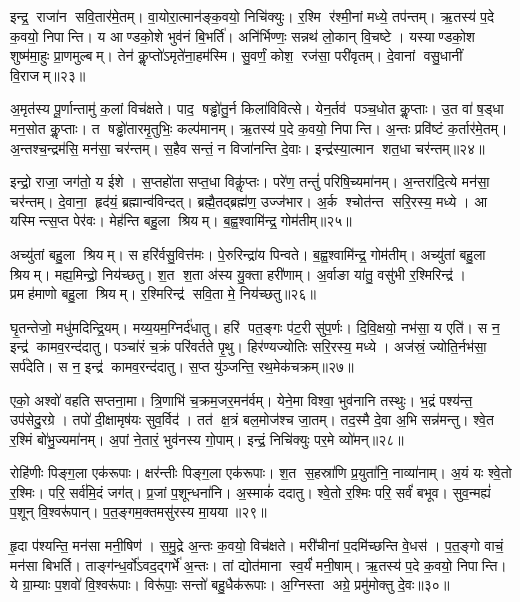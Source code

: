 इन्द्र॒ राजा॑न सवि॒तार॑मे॒तम्। वा॒योरा॒त्मान॑ङ्क॒वयो॒ निचि॑क्युः। र॒श्मि र॑श्मी॒नां मध्ये॒ तप॑न्तम्। ऋ॒तस्य॑ प॒दे क॒वयो॒ निपान्ति। य आण्डको॒शे भुव॑नं बि॒भर्ति॑। अनि॑र्भिण्णः॒ सन्नथ॑ लो॒कान् वि॒चष्टे। यस्याण्डको॒श शुष्म॑मा॒हुः प्रा॒णमुल्बम्। तेन॑ कॢ॒प्तो॑ऽमृते॑ना॒हम॑स्मि। सु॒वर्णं॒ कोश॒ रज॑सा॒ परी॑वृतम्। दे॒वानां वसु॒धानीं  वि॒राजम्॥२३॥%

अ॒मृत॑स्य पू॒र्णान्तामु॑ क॒लां  विच॑क्षते। पाद॒ षड्ढो॑तु॒र्न किला॑विवित्से। येन॒र्तव॑ पञ्च॒धोत कॢ॒प्ताः। उ॒त वा॑ ष॒ड्धा मन॒सोत कॢ॒प्ताः। त षड्ढो॑तारमृ॒तुभिः॒ कल्प॑मानम्। ऋ॒तस्य॑ प॒दे क॒वयो॒ निपान्ति। अ॒न्तः प्रवि॑ष्टं क॒र्तार॑मे॒तम्। अ॒न्तश्च॒न्द्रम॑सि॒ मन॑सा॒ चर॑न्तम्। स॒हैव सन्तं॒ न विजा॑नन्ति दे॒वाः। इन्द्र॑स्या॒त्मान शत॒धा चर॑न्तम्॥२४॥%

इन्द्रो॒ राजा॒ जग॑तो॒ य ईशे। स॒प्तहो॑ता सप्त॒धा विकॢ॑प्तः। परे॑ण॒ तन्तुं॑ परिषि॒च्यमा॑नम्। अ॒न्तरा॑दि॒त्ये मन॑सा॒ चर॑न्तम्। दे॒वाना॒ हृद॑यं॒ ब्रह्मान्व॑विन्दत्। ब्रह्मै॒तद्ब्रह्म॑ण॒ उज्ज॑भार। अ॒र्क श्चोत॑न्त सरि॒रस्य॒ मध्ये। आ यस्मिन्त्स॒प्त पेर॑वः। मेह॑न्ति बहु॒ला श्रियम्। ब॒ह्व॒श्वामि॑न्द्र॒ गोम॑तीम्॥२५॥%

अच्यु॑तां बहु॒ला श्रियम्। स हरि॑र्वसु॒वित्त॑मः। पे॒रुरिन्द्रा॑य पिन्वते। ब॒ह्व॒श्वामि॑न्द्र॒ गोम॑तीम्। अच्यु॑तां बहु॒ला श्रियम्। मह्य॒मिन्द्रो॒ निय॑च्छतु। श॒त श॒ता अ॑स्य यु॒क्ता हरी॑णाम्। अ॒र्वाङा या॑तु॒ वसु॑भी र॒श्मिरिन्द्र॑। प्रमह॑माणो बहु॒ला श्रियम्। र॒श्मिरिन्द्र॑ सवि॒ता मे॒ निय॑च्छतु॥२६॥%

घृ॒तन्तेजो॒ मधु॑मदिन्द्रि॒यम्। मय्य॒यम॒ग्निर्द॑धातु। हरि॑ पत॒ङ्गः प॑ट॒री सु॑प॒र्णः। दि॒वि॒क्षयो॒ नभ॑सा॒ य एति॑। स न॒ इन्द्र॑ कामव॒रन्द॑दातु। पञ्चा॑रं च॒क्रं परि॑वर्तते पृ॒थु। हिर॑ण्यज्योतिः सरि॒रस्य॒ मध्ये। अज॑स्रं॒ ज्योति॒र्नभ॑सा॒ सर्प॑देति। स न॒ इन्द्र॑ कामव॒रन्द॑दातु। स॒प्त यु॑ञ्जन्ति॒ रथ॒मेक॑चक्रम्॥२७॥%

एको॒ अश्वो॑ वहति सप्तना॒मा। त्रि॒णाभि॑ च॒क्रम॒जर॒मन॑र्वम्। येने॒मा विश्वा॒ भुव॑नानि तस्थुः। भ॒द्रं पश्य॑न्त॒ उप॑सेदु॒रग्रे। तपो॑ दी॒क्षामृष॑यः सुव॒र्विद॑। तत॑ क्ष॒त्रं बल॒मोज॑श्च जा॒तम्। तद॒स्मै दे॒वा अ॒भि सन्न॑मन्तु। श्वे॒त र॒श्मिं बो॑भु॒ज्यमा॑नम्। अ॒पां ने॒तारं॒ भुव॑नस्य गो॒पाम्। इन्द्रं॒ निचि॑क्युः पर॒मे व्यो॑मन्॥२८॥

रोहि॑णीः पिङ्ग॒ला एक॑रूपाः। क्षर॑न्तीः पिङ्ग॒ला एक॑रूपाः। श॒त स॒हस्रा॑णि प्र॒युता॑नि॒ नाव्या॑नाम्। अ॒यं यः श्वे॒तो र॒श्मिः। परि॒ सर्व॑मि॒दं जग॑त्। प्र॒जां प॒शून्धना॑नि। अ॒स्माकं॑ ददातु। श्वे॒तो र॒श्मिः परि॒ सर्वं॑ बभूव। सुव॒न्मह्यं॑ प॒शून् वि॒श्वरू॑पान्। प॒त॒ङ्गम॒क्तमसु॑रस्य मा॒यया॥२९॥%

हृ॒दा प॑श्यन्ति॒ मन॑सा मनी॒षिण॑। स॒मु॒द्रे अ॒न्तः क॒वयो॒ विच॑क्षते। मरी॑चीनां प॒दमि॑च्छन्ति वे॒धस॑। प॒त॒ङ्गो वाचं॒ मन॑सा बिभर्ति। ताङ्ग॑न्ध॒र्वो॑ऽवद॒द्गर्भे॑ अ॒न्तः। तां द्योत॑माना स्व॒र्यं॑ मनी॒षाम्। ऋ॒तस्य॑ प॒दे क॒वयो॒ निपान्ति। ये ग्रा॒म्याः प॒शवो॑ वि॒श्वरू॑पाः। विरू॑पाः॒ सन्तो॑ बहु॒धैक॑रूपाः। अ॒ग्निस्ता अग्रे॒ प्रमु॑मोक्तु दे॒वः॥३०॥

